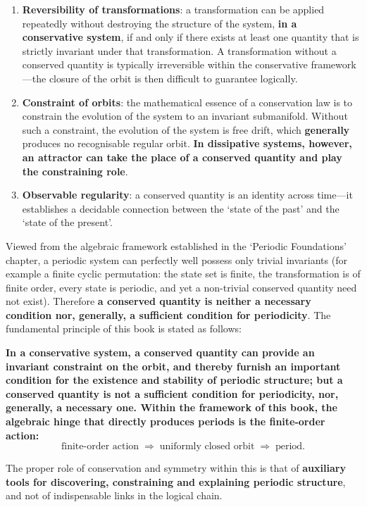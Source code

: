 \begin{enumerate}[label=(\roman*)]
    \item \textbf{Reversibility of transformations}: a transformation can be applied repeatedly without destroying the structure of the system, \textbf{in a conservative system}, if and only if there exists at least one quantity that is strictly invariant under that transformation. A transformation without a conserved quantity is typically irreversible within the conservative framework---the closure of the orbit is then difficult to guarantee logically.
    \item \textbf{Constraint of orbits}: the mathematical essence of a conservation law is to constrain the evolution of the system to an invariant submanifold. Without such a constraint, the evolution of the system is free drift, which \textbf{generally} produces no recognisable regular orbit. \textbf{In dissipative systems, however, an attractor can take the place of a conserved quantity and play the constraining role}.
    \item \textbf{Observable regularity}: a conserved quantity is an identity across time---it establishes a decidable connection between the `state of the past' and the `state of the present'.
\end{enumerate}

Viewed from the algebraic framework established in the `Periodic Foundations' chapter, a periodic system can perfectly well possess only trivial invariants (for example a finite cyclic permutation: the state set is finite, the transformation is of finite order, every state is periodic, and yet a non-trivial conserved quantity need not exist). Therefore \textbf{a conserved quantity is neither a necessary condition nor, generally, a sufficient condition for periodicity}. The fundamental principle of this book is stated as follows:

\textbf{In a conservative system, a conserved quantity can provide an invariant constraint on the orbit, and thereby furnish an important condition for the existence and stability of periodic structure; but a conserved quantity is not a sufficient condition for periodicity, nor, generally, a necessary one. Within the framework of this book, the algebraic hinge that directly produces periods is the finite-order action:}\[
\text{finite-order action} \;\Longrightarrow\; \text{uniformly closed orbit} \;\Longrightarrow\; \text{period}.
\]

The proper role of conservation and symmetry within this is that of \textbf{auxiliary tools for discovering, constraining and explaining periodic structure}, and not of indispensable links in the logical chain.

